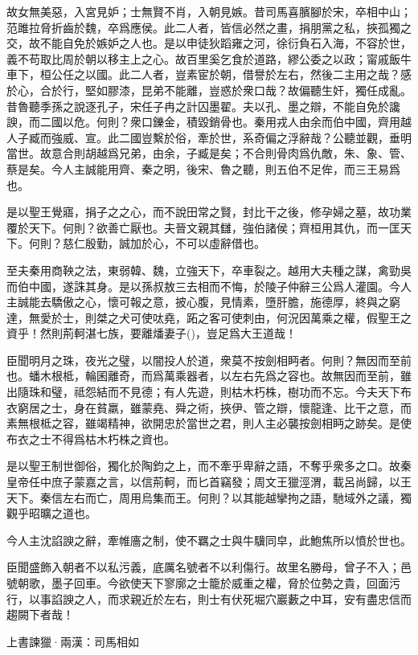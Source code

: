 \documentclass[12pt,a4paper]{ctexbook}
\begin{document}
故女無美惡，入宮見妒；士無賢不肖，入朝見嫉。昔司馬喜臏腳於宋，卒相中山；范雎拉脅折齒於魏，卒爲應侯。此二人者，皆信必然之畫，捐朋黨之私，挾孤獨之交，故不能自免於嫉妒之人也。是以申徒狄蹈雍之河，徐衍負石入海，不容於世，義不苟取比周於朝以移主上之心。故百里奚乞食於道路，繆公委之以政；甯戚飯牛車下，桓公任之以國。此二人者，豈素宦於朝，借譽於左右，然後二主用之哉？感於心，合於行，堅如膠漆，昆弟不能離，豈惑於衆口哉？故偏聽生奸，獨任成亂。昔魯聽季孫之說逐孔子，宋任子冉之計囚墨翟。夫以孔、墨之辯，不能自免於讒諛，而二國以危。何則？衆口鑠金，積毀銷骨也。秦用戎人由余而伯中國，齊用越人子臧而強威、宣。此二國豈繫於俗，牽於世，系奇偏之浮辭哉？公聽並觀，垂明當世。故意合則胡越爲兄弟，由余，子臧是矣；不合則骨肉爲仇敵，朱、象、管、蔡是矣。今人主誠能用齊、秦之明，後宋、魯之聽，則五伯不足侔，而三王易爲也。\par
是以聖王覺寤，捐子之之心，而不說田常之賢，封比干之後，修孕婦之墓，故功業覆於天下。何則？欲善亡厭也。夫晉文親其讎，強伯諸侯；齊桓用其仇，而一匡天下。何則？慈仁殷勤，誠加於心，不可以虛辭借也。\par
至夫秦用商鞅之法，東弱韓、魏，立強天下，卒車裂之。越用大夫種之謀，禽勁吳而伯中國，遂誅其身。是以孫叔敖三去相而不悔，於陵子仲辭三公爲人灌園。今人主誠能去驕傲之心，懷可報之意，披心腹，見情素，墮肝膽，施德厚，終與之窮達，無愛於士，則桀之犬可使呔堯，跖之客可使刺由，何況因萬乘之權，假聖王之資乎！然則荊軻湛七族，要離燔妻子()，豈足爲大王道哉！\par
臣聞明月之珠，夜光之璧，以闇投人於道，衆莫不按劍相眄者。何則？無因而至前也。蟠木根柢，輪囷離奇，而爲萬乘器者，以左右先爲之容也。故無因而至前，雖出隨珠和璧，祗怨結而不見德；有人先遊，則枯木朽株，樹功而不忘。今夫天下布衣窮居之士，身在貧羸，雖蒙堯、舜之術，挾伊、管之辯，懷龍逢、比干之意，而素無根柢之容，雖竭精神，欲開忠於當世之君，則人主必襲按劍相眄之跡矣。是使布衣之士不得爲枯木朽株之資也。\par
是以聖王制世御俗，獨化於陶鈞之上，而不牽乎卑辭之語，不奪乎衆多之口。故秦皇帝任中庶子蒙嘉之言，以信荊軻，而匕首竊發；周文王獵涇渭，載呂尚歸，以王天下。秦信左右而亡，周用烏集而王。何則？以其能越攣拘之語，馳域外之議，獨觀乎昭曠之道也。\par
今人主沈諂諛之辭，牽帷廧之制，使不羈之士與牛驥同皁，此鮑焦所以憤於世也。\par
臣聞盛飾入朝者不以私污義，底厲名號者不以利傷行。故里名勝母，曾子不入；邑號朝歌，墨子回車。今欲使天下寥廓之士籠於威重之權，脅於位勢之貴，回面污行，以事諂諛之人，而求親近於左右，則士有伏死堀穴巖藪之中耳，安有盡忠信而趨闕下者哉！\par
上書諫獵·兩漢：司馬相如 \par
\end{document}
